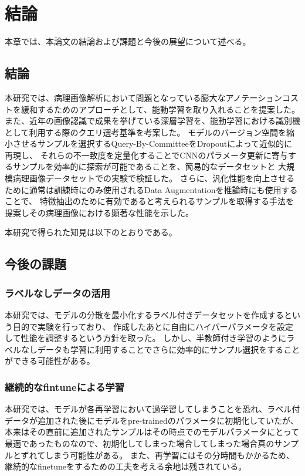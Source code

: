 \chapter{結論}
本章では、本論文の結論および課題と今後の展望について述べる。

\section{結論}
本研究では、病理画像解析において問題となっている膨大なアノテーションコストを緩和するためのアプローチとして、能動学習を取り入れることを提案した。
また、近年の画像認識で成果を挙げている深層学習を、能動学習における識別機として利用する際のクエリ選考基準を考案した。
モデルのバージョン空間を縮小させるサンプルを選択するQuery-By-CommitteeをDropoutによって近似的に再現し、
それらの不一致度を定量化することでCNNのパラメータ更新に寄与するサンプルを効率的に探索が可能であることを、簡易的なデータセットと
大規模病理画像データセットでの実験で検証した。
さらに、汎化性能を向上させるために通常は訓練時にのみ使用されるData Augmentationを推論時にも使用することで、
特徴抽出のために有効であると考えられるサンプルを取得する手法を提案しその病理画像における顕著な性能を示した。

本研究で得られた知見は以下のとおりである。

\section{今後の課題}

\subsection{ラベルなしデータの活用}
本研究では、モデルの分散を最小化するラベル付きデータセットを作成するという目的で実験を行っており、
作成したあとに自由にハイパーパラメータを設定して性能を調整するという方針を取った。
しかし、半教師付き学習のようにラベルなしデータも学習に利用することでさらに効率的にサンプル選択をすることができる可能性がある。

\subsection{継続的なfintuneによる学習}
本研究では、モデルが各再学習において過学習してしまうことを恐れ、ラベル付データが追加された後にモデルをpre-trainedのパラメータに初期化していたが、
本来はその直前に追加されたサンプルはその時点でのモデルパラメータにとって最適であったものなので、初期化してしまった場合してしまった場合真のサンプルとずれてしまう可能性がある。
また、再学習にはその分時間もかかるため、継続的なfinetuneをするための工夫を考える余地は残されている。
